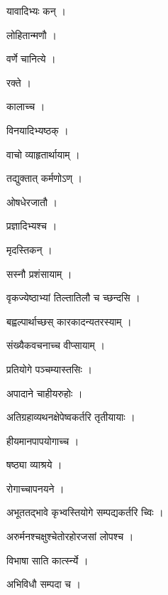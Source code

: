 \documentclass[10pt, openany]{book}
\begin{document}
\noindent यावादिभ्यः कन् ।

\noindent लोहितान्मणौ ।

\noindent वर्णे चानित्ये ।

\noindent रक्ते ।

\noindent कालाच्च ।

\noindent विनयादिभ्यष्ठक् ।

\noindent वाचो व्याहृतार्थायाम् ।

\noindent तद्युक्तात् कर्मणोऽण् ।

\noindent ओषधेरजातौ ।

\noindent प्रज्ञादिभ्यश्च ।

\noindent मृदस्तिकन् ।

\noindent सस्नौ प्रशंसायाम् ।

\noindent वृकज्येष्ठाभ्यां तिल्तातिलौ च च्छन्दसि ।

\noindent बह्वल्पार्थाच्छस् कारकादन्यतरस्याम् ।

\noindent संख्यैकवचनाच्च वीप्सायाम् ।

\noindent प्रतियोगे पञ्चम्यास्तसिः ।

\noindent अपादाने चाहीयरुहोः ।

\noindent अतिग्रहाव्यथनक्षेपेष्वकर्तरि तृतीयायाः ।

\noindent हीयमानपापयोगाच्च ।

\noindent षष्ठ्या व्याश्रये ।

\noindent रोगाच्चापनयने ।

\noindent अभूततद्भावे कृभ्वस्तियोगे सम्पद्यकर्तरि च्विः ।

\noindent अरुर्मनश्चक्षुश्चेतोरहोरजसां लोपश्च ।

\noindent विभाषा साति कार्त्स्न्ये ।

\noindent अभिविधौ सम्पदा च ।
\end{document}
